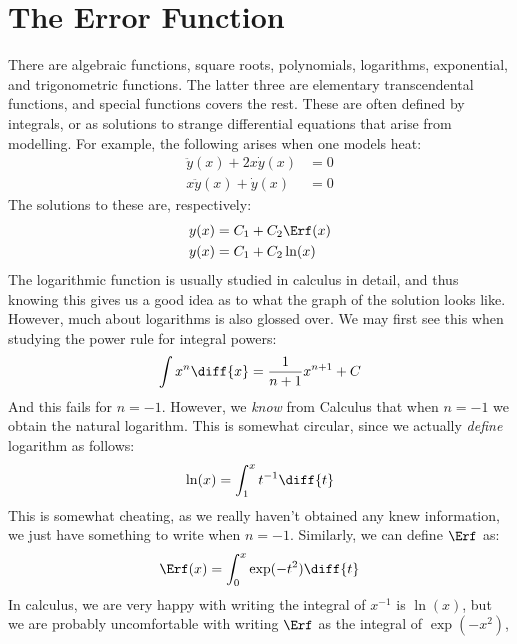 \documentclass[crop=false,class=book,oneside]{standalone}
\begin{document}
    \section{The Error Function}
        There are algebraic functions, square roots, polynomials,
        logarithms, exponential, and trigonometric functions.
        The latter three are elementary transcendental functions,
        and special functions covers the rest. These are often
        defined by integrals, or as solutions to strange
        differential equations that arise from modelling. For
        example, the following arises when one models heat:
        \begin{align}
            \ddot{y}(x)+2x\dot{y}(x)&=0\\
            x\ddot{y}(x)+\dot{y}(x)&=0
        \end{align}
        The solutions to these are, respectively:
        \begin{align}
            y(x)&=C_{1}+C_{2}\Erf(x)\\
            y(x)&=C_{1}+C_{2}\ln(x)
        \end{align}
        The logarithmic function is usually studied in
        calculus in detail, and thus knowing this gives us a
        good idea as to what the graph of the solution looks like.
        However, much about logarithms is also glossed over.
        We may first see this when studying the power rule for
        integral powers:
        \begin{equation}
            \int{x}^{n}\diff{x}=\frac{1}{n+1}x^{n+1}+C
        \end{equation}
        And this fails for $n=-1$. However, we \textit{know}
        from Calculus that when $n=-1$ we obtain the natural
        logarithm. This is somewhat circular, since we actually
        \textit{define} logarithm as follows:
        \begin{equation}
            \ln(x)=\int_{1}^{x}t^{-1}\diff{t}
        \end{equation}
        This is somewhat cheating, as we really haven't obtained
        any knew information, we just have something to write
        when $n=-1$. Similarly, we can define $\Erf$ as:
        \begin{equation}
            \Erf(x)=\int_{0}^{x}\exp(-t^{2})\diff{t}
        \end{equation}
        In calculus, we are very happy with writing the integral
        of $x^{-1}$ is $\ln(x)$, but we are probably uncomfortable
        with writing $\Erf$ as the integral of $\exp(-x^{2})$,
\end{document}

